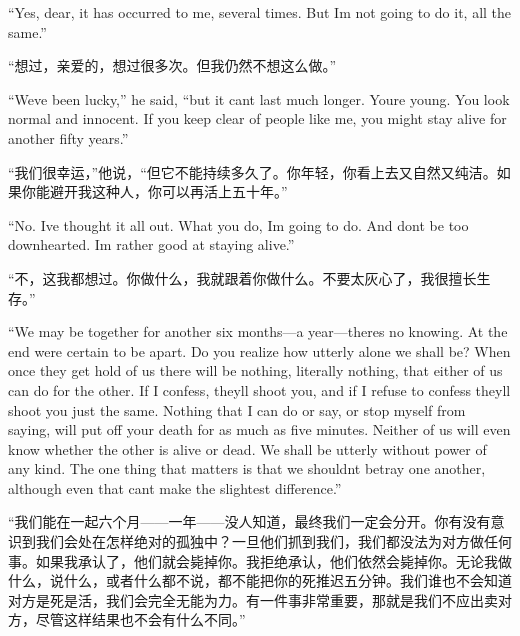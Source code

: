 \begin{paracol}{2}
``Yes, dear, it has occurred to me, several times. But
I\textquotesingle m not going to do it, all the same.''

\switchcolumn

``想过，亲爱的，想过很多次。但我仍然不想这么做。''

\switchcolumn*

``We\textquotesingle ve been lucky,'' he said, ``but it
can\textquotesingle t last much longer. You\textquotesingle re young.
You look normal and innocent. If you keep clear of people like me, you
might stay alive for another fifty years.''

\switchcolumn

``我们很幸运，''他说，``但它不能持续多久了。你年轻，你看上去又自然又纯洁。如果你能避开我这种人，你可以再活上五十年。''

\switchcolumn*

``No. I\textquotesingle ve thought it all out. What you do,
I\textquotesingle m going to do. And don\textquotesingle t be too
downhearted. I\textquotesingle m rather good at staying alive.''

\switchcolumn

``不，这我都想过。你做什么，我就跟着你做什么。不要太灰心了，我很擅长生存。''

\switchcolumn*

``We may be together for another six months---a
year---there\textquotesingle s no knowing. At the end
we\textquotesingle re certain to be apart. Do you realize how utterly
alone we shall be? When once they get hold of us there will be nothing,
literally nothing, that either of us can do for the other. If I confess,
they\textquotesingle ll shoot you, and if I refuse to confess
they\textquotesingle ll shoot you just the same. Nothing that I can do
or say, or stop myself from saying, will put off your death for as much
as five minutes. Neither of us will even know whether the other is alive
or dead. We shall be utterly without power of any kind. The one thing
that matters is that we shouldn\textquotesingle t betray one another,
although even that can\textquotesingle t make the slightest difference.''

\switchcolumn

``我们能在一起六个月——一年——没人知道，最终我们一定会分开。你有没有意识到我们会处在怎样绝对的孤独中？一旦他们抓到我们，我们都没法为对方做任何事。如果我承认了，他们就会毙掉你。我拒绝承认，他们依然会毙掉你。无论我做什么，说什么，或者什么都不说，都不能把你的死推迟五分钟。我们谁也不会知道对方是死是活，我们会完全无能为力。有一件事非常重要，那就是我们不应出卖对方，尽管这样结果也不会有什么不同。''


\end{paracol}
